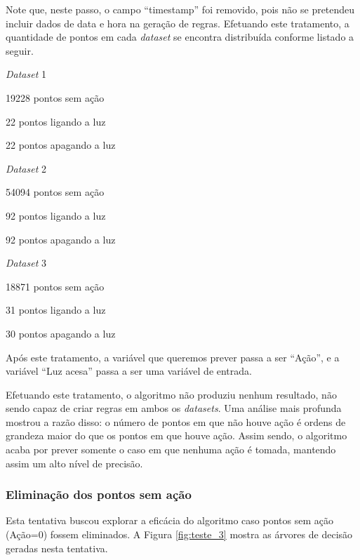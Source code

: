 Note que, neste passo, o campo ``timestamp'' foi removido, pois não se pretendeu incluir dados de data e hora na geração de regras. Efetuando este tratamento, a quantidade de pontos em cada \textit{dataset} se encontra distribuída conforme listado a seguir.

\begin{itemize_compact}
	\item \textit{Dataset} 1
	\begin{itemize_compact}
		\item 19228 pontos sem ação
		\item 22 pontos ligando a luz
		\item 22 pontos apagando a luz
	\end{itemize_compact}
		\item \textit{Dataset} 2
	\begin{itemize_compact}
		\item 54094 pontos sem ação
		\item 92 pontos ligando a luz
		\item 92 pontos apagando a luz
	\end{itemize_compact}
		\item \textit{Dataset} 3
	\begin{itemize_compact}
		\item 18871 pontos sem ação
		\item 31 pontos ligando a luz
		\item 30 pontos apagando a luz
	\end{itemize_compact}
\end{itemize_compact}

Após este tratamento, a variável que queremos prever passa a ser ``Ação'', e a variável ``Luz acesa'' passa a ser uma variável de entrada.

Efetuando este tratamento, o algoritmo não produziu nenhum resultado, não sendo capaz de criar regras em ambos os \textit{datasets}. Uma análise mais profunda mostrou a razão disso: o número de pontos em que não houve ação é ordens de grandeza maior do que os pontos em que houve ação. Assim sendo, o algoritmo acaba por prever somente o caso em que nenhuma ação é tomada, mantendo assim um alto nível de precisão. 

\subsubsection{Eliminação dos pontos sem ação} \label{subsubsec:elim_pts_sem_acao}
Esta tentativa buscou explorar a eficácia do algoritmo caso pontos sem ação (Ação=0) fossem eliminados. A Figura \ref{fig:teste_3} mostra as árvores de decisão geradas nesta tentativa.

